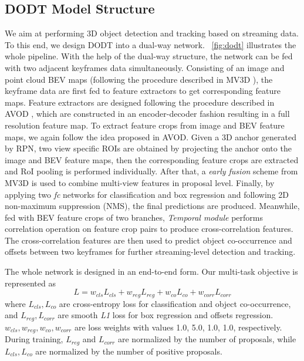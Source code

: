 \documentclass[letterpaper, 10pt, conference]{ieeeconf}  %
\begin{document}
\subsection{DODT Model Structure} 
We aim at performing 3D object detection and tracking based on streaming data. To this end, we design DODT into a dual-way network. \figurename \, \ref{fig:dodt} illustrates the whole pipeline. With the help of the dual-way structure, the network can be fed with two adjacent keyframes data simultaneously. Consisting of an image and point cloud BEV maps (following the procedure described in MV3D \cite{chen2017multi}), the keyframe data are first fed to feature extractors to get corresponding feature maps. Feature extractors are designed following the procedure described in AVOD \cite{ku2018joint}, which are constructed in an encoder-decoder fashion resulting in a full resolution feature map. To extract feature crops from image and BEV feature maps, we again follow the idea proposed in AVOD. Given a 3D anchor generated by RPN, two view specific ROIs are obtained by projecting the anchor onto the image and BEV feature maps, then the corresponding feature crops are extracted and RoI pooling is performed individually. After that, a \textit{early fusion} scheme from MV3D \cite{chen2017multi} is used to combine multi-view features in proposal level. Finally, by applying two \textit{fc} networks for classification and box regression and following 2D non-maximum suppression (NMS), the final predictions are produced. Meanwhile, fed with BEV feature crops of two branches, \textit{Temporal module} performs correlation operation on feature crop pairs to produce cross-correlation features. The cross-correlation features are then used to predict object co-occurrence and offsets between two keyframes for further streaming-level detection and tracking.

The whole network is designed in an end-to-end form. Our multi-task objective is represented as
\begin{equation}
L = w_{cls}L_{cls} + w_{reg}L_{reg} + w_{co}L_{co} + w_{corr}L_{corr}
\end{equation}
where $L_{cls}, L_{co}$ are cross-entropy loss for classification and object co-occurrence, and $L_{reg}, L_{corr}$ are smooth \textit{L1} loss for box regression and offsets regression. $w_{cls}, w_{reg}, w_{co}, w_{corr}$ are loss weights with values 1.0, 5.0, 1.0, 1.0, respectively. During training, $L_{reg}$ and $L_{corr}$ are normalized by the number of proposals, while $L_{cls}, L_{co}$ are normalized by the number of positive proposals.
\end{document}
